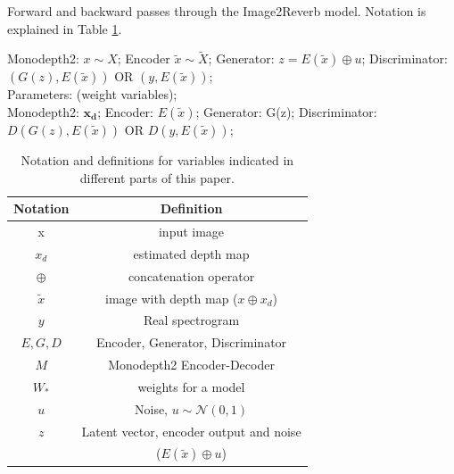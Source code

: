 \documentclass[10pt,twocolumn,letterpaper]{article}
\begin{document}
\begin{algorithm}
    \caption{Forward and backward passes through the Image2Reverb model. Notation is explained in Table \ref{tab:vardefinitions}.}
    \label{algo:model}
    \KwIn{}
    Monodepth2: $x \sim X$; Encoder $\tilde{x} \sim \tilde{X}$; Generator: $z = E(\tilde{x}) \oplus u$; Discriminator: $(G(z), E(\tilde{x}))$ OR $(y, E(\tilde{x}))$;\\
    Parameters: (weight variables);\\
    \KwOut{}
    Monodepth2: $\mathbf{x_d}$; Encoder: $E(\tilde{x})$; Generator: G(z); Discriminator: $D(G(z), E(\tilde{x}))$ OR $D(y, E(\tilde{x}))$; \\
\end{algorithm}

\begin{table}[ht]
    \small
    \centering
    \begin{tabular}{c|c}
        Notation & Definition \\
        \hline
         x & input image \\
         $x_d$ & estimated depth map \\
         $\oplus$ & concatenation operator\\
         $\tilde{x}$ & image with depth map ($x \oplus x_d$) \\
         $y$ & Real spectrogram \\
         $E, G, D$ & Encoder, Generator, Discriminator\\
         $M$ & Monodepth2 Encoder-Decoder \\
         $W_*$ & weights for a model \\
         $u$ & Noise, $u \sim \mathcal{N}(0, 1) $\\
         $z$ & Latent vector, encoder output and noise\\ & ($E(\tilde{x}) \oplus u$) \\
    \end{tabular}
    \caption{Notation and definitions for variables indicated in different parts of this paper.}
    \label{tab:vardefinitions}
\end{table}
\end{document}
